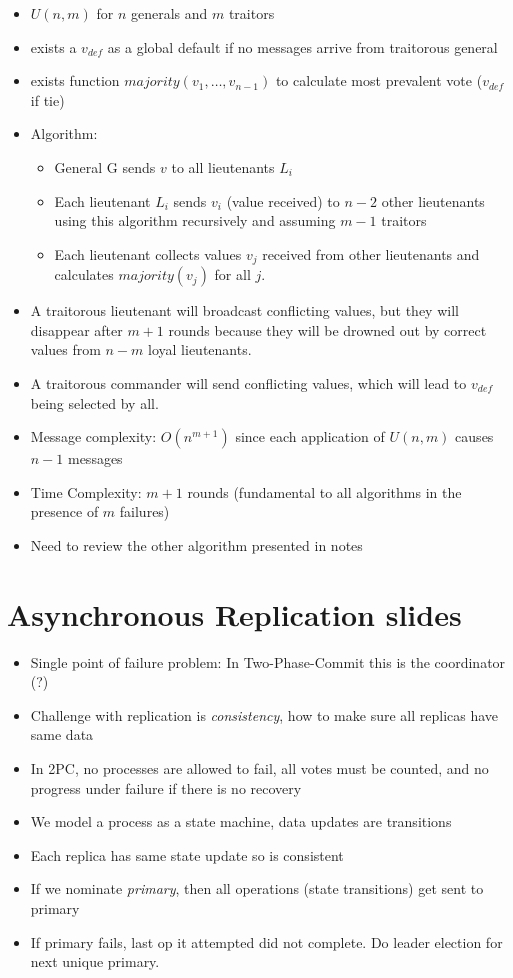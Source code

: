 \documentclass[a4paper,10pt,]{article}
\begin{document}
\begin{itemize}
  \item $U(n,m)$ for $n$ generals and $m$ traitors
  \item exists a $v_{def}$ as a global default if no messages arrive from traitorous general
  \item exists function $majority(v_1, \ldots, v_{n-1})$ to calculate most prevalent vote ($v_{def}$ if tie)
  \item Algorithm:
  \begin{itemize}
    \item General G sends $v$ to all lieutenants $L_i$
    \item Each lieutenant $L_i$ sends $v_i$ (value received) to $n-2$ other lieutenants using this algorithm recursively and assuming $m-1$ traitors
    \item Each lieutenant collects values $v_j$ received from other lieutenants and calculates $majority(v_j)$ for all $j$.
  \end{itemize}
  \item A traitorous lieutenant will broadcast conflicting values, but they will disappear after $m+1$ rounds because they will be drowned out by correct values from $n-m$ loyal lieutenants.
  \item A traitorous commander will send conflicting values, which will lead to $v_{def}$ being selected by all.
  \item Message complexity: $O(n^{m+1})$ since each application of $U(n,m)$ causes $n-1$ messages
  \item  Time Complexity: $m+1$ rounds (fundamental to all algorithms in the presence of $m$ failures)
  \item Need to review the other algorithm presented in notes
\end{itemize}

\section{Asynchronous Replication slides}
\begin{itemize}
  \item Single point of failure problem: In Two-Phase-Commit this is the coordinator (?)
  \item Challenge with replication is \emph{consistency}, how to make sure all replicas have same data
  \item In 2PC, no processes are allowed to fail, all votes must be counted, and no progress under failure if there is no recovery
  \item We model a process as a state machine, data updates are transitions
  \item Each replica has same state update so is consistent
  \item If we nominate \emph{primary}, then all operations (state transitions) get sent to primary
  \item If primary fails, last op it attempted did not complete.  Do leader election for next unique primary.
\end{itemize}
\end{document}
